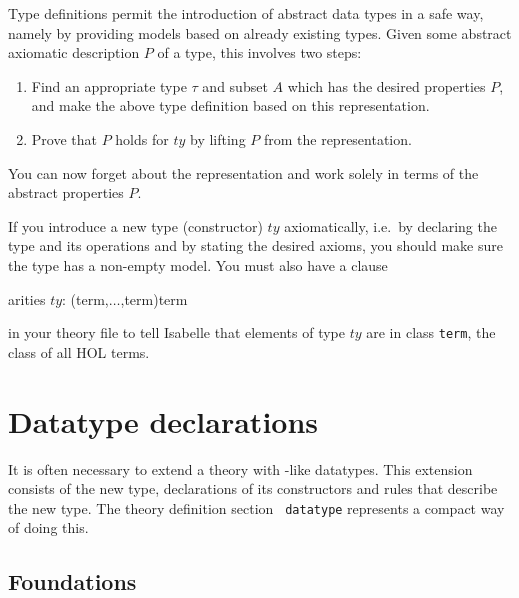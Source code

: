 Type definitions permit the introduction of abstract data types in a safe
way, namely by providing models based on already existing types. Given some
abstract axiomatic description $P$ of a type, this involves two steps:
\begin{enumerate}
\item Find an appropriate type $\tau$ and subset $A$ which has the desired
  properties $P$, and make the above type definition based on this
  representation.
\item Prove that $P$ holds for $ty$ by lifting $P$ from the representation.
\end{enumerate}
You can now forget about the representation and work solely in terms of the
abstract properties $P$.

\begin{warn}
If you introduce a new type (constructor) $ty$ axiomatically, i.e.\ by
declaring the type and its operations and by stating the desired axioms, you
should make sure the type has a non-empty model. You must also have a clause
\begin{ttbox}
arities \(ty\): (term,\(\dots\),term)term
\end{ttbox}
in your theory file to tell Isabelle that elements of type $ty$ are in class
{\tt term}, the class of all HOL terms.
\end{warn}

\section{Datatype declarations}
\label{sec:HOL:datatype}

\underscoreon

It is often necessary to extend a theory with \ML-like datatypes.  This
extension consists of the new type, declarations of its constructors and
rules that describe the new type. The theory definition section {\tt
  datatype} represents a compact way of doing this.


\subsection{Foundations}

